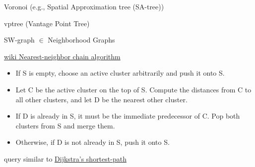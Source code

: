 \documentclass[xcolor=dvipsnames, aspectratio=1610]{beamer}
\newcommand{\citeWork}[1]{ {\scriptsize{\color{Refcol} #1  \color{Black}}}}
\begin{document}
\begin{frame}{Voronoi (e.g., Spatial Approximation tree (SA-tree)) } 
\linespread{1}\small{
\begin{minipage}{0.6\textwidth}  
\end{minipage}
}
\end{frame}


\begin{frame}{vptree (Vantage Point Tree)} 
\linespread{1}\small{
\begin{minipage}{0.6\textwidth}  
\end{minipage}
}
\end{frame}



\begin{frame}{SW-graph $\in$ Neighborhood Graphs} 
\linespread{1}\small{
\begin{minipage}{0.6\textwidth}  
\end{minipage}
\begin{minipage}{0.38\textwidth}  
\href{https://en.wikipedia.org/wiki/Nearest-neighbor_chain_algorithm}{\citeWork{wiki Nearest-neighbor chain algorithm}} 
 
\begin{itemize}
\item        If S is empty, choose an active cluster arbitrarily and push it onto S.
\item        Let C be the active cluster on the top of S. Compute the distances from C to all other clusters, and let D be the nearest other cluster.
\item        If D is already in S, it must be the immediate predecessor of C. Pop both clusters from S and merge them.
\item        Otherwise, if D is not already in S, push it onto S.
\end{itemize}
query similar to \href{https://de.wikipedia.org/wiki/Dijkstra-Algorithmus}{\citeWork{Dijkstra’s shortest-path}}
\end{minipage}
}
\end{frame}
\end{document}
